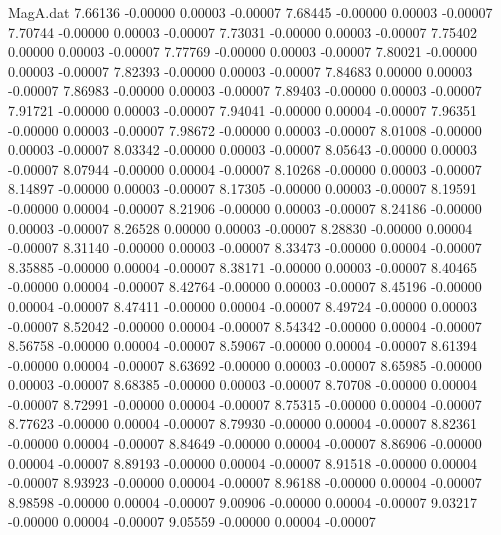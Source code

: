 \begin{filecontents}{MagA.dat}
   7.66136   -0.00000    0.00003   -0.00007
   7.68445   -0.00000    0.00003   -0.00007
   7.70744   -0.00000    0.00003   -0.00007
   7.73031   -0.00000    0.00003   -0.00007
   7.75402    0.00000    0.00003   -0.00007
   7.77769   -0.00000    0.00003   -0.00007
   7.80021   -0.00000    0.00003   -0.00007
   7.82393   -0.00000    0.00003   -0.00007
   7.84683    0.00000    0.00003   -0.00007
   7.86983   -0.00000    0.00003   -0.00007
   7.89403   -0.00000    0.00003   -0.00007
   7.91721   -0.00000    0.00003   -0.00007
   7.94041   -0.00000    0.00004   -0.00007
   7.96351   -0.00000    0.00003   -0.00007
   7.98672   -0.00000    0.00003   -0.00007
   8.01008   -0.00000    0.00003   -0.00007
   8.03342   -0.00000    0.00003   -0.00007
   8.05643   -0.00000    0.00003   -0.00007
   8.07944   -0.00000    0.00004   -0.00007
   8.10268   -0.00000    0.00003   -0.00007
   8.14897   -0.00000    0.00003   -0.00007
   8.17305   -0.00000    0.00003   -0.00007
   8.19591   -0.00000    0.00004   -0.00007
   8.21906   -0.00000    0.00003   -0.00007
   8.24186   -0.00000    0.00003   -0.00007
   8.26528    0.00000    0.00003   -0.00007
   8.28830   -0.00000    0.00004   -0.00007
   8.31140   -0.00000    0.00003   -0.00007
   8.33473   -0.00000    0.00004   -0.00007
   8.35885   -0.00000    0.00004   -0.00007
   8.38171   -0.00000    0.00003   -0.00007
   8.40465   -0.00000    0.00004   -0.00007
   8.42764   -0.00000    0.00003   -0.00007
   8.45196   -0.00000    0.00004   -0.00007
   8.47411   -0.00000    0.00004   -0.00007
   8.49724   -0.00000    0.00003   -0.00007
   8.52042   -0.00000    0.00004   -0.00007
   8.54342   -0.00000    0.00004   -0.00007
   8.56758   -0.00000    0.00004   -0.00007
   8.59067   -0.00000    0.00004   -0.00007
   8.61394   -0.00000    0.00004   -0.00007
   8.63692   -0.00000    0.00003   -0.00007
   8.65985   -0.00000    0.00003   -0.00007
   8.68385   -0.00000    0.00003   -0.00007
   8.70708   -0.00000    0.00004   -0.00007
   8.72991   -0.00000    0.00004   -0.00007
   8.75315   -0.00000    0.00004   -0.00007
   8.77623   -0.00000    0.00004   -0.00007
   8.79930   -0.00000    0.00004   -0.00007
   8.82361   -0.00000    0.00004   -0.00007
   8.84649   -0.00000    0.00004   -0.00007
   8.86906   -0.00000    0.00004   -0.00007
   8.89193   -0.00000    0.00004   -0.00007
   8.91518   -0.00000    0.00004   -0.00007
   8.93923   -0.00000    0.00004   -0.00007
   8.96188   -0.00000    0.00004   -0.00007
   8.98598   -0.00000    0.00004   -0.00007
   9.00906   -0.00000    0.00004   -0.00007
   9.03217   -0.00000    0.00004   -0.00007
   9.05559   -0.00000    0.00004   -0.00007

\end{filecontents}
